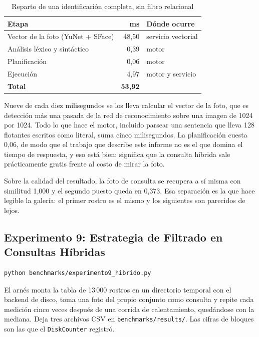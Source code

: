 \documentclass[a4paper,12pt]{article}
\begin{document}
\begin{table}[H]
\centering
\caption{Reparto de una identificación completa, sin filtro relacional}
\begin{tabular}{@{}lrl@{}}
\toprule
\textbf{Etapa} & \textbf{ms} & \textbf{Dónde ocurre} \\
\midrule
Vector de la foto (YuNet + SFace) & 48{,}50 & servicio vectorial \\
Análisis léxico y sintáctico & 0{,}39 & motor \\
Planificación & 0{,}06 & motor \\
Ejecución & 4{,}97 & motor y servicio \\
\midrule
\textbf{Total} & \textbf{53{,}92} & \\
\bottomrule
\end{tabular}
\end{table}

Nueve de cada diez milisegundos se los lleva calcular el vector de la foto, que
es detección más una pasada de la red de reconocimiento sobre una imagen de
1024 por 1024. Todo lo que hace el motor, incluido parsear una sentencia que
lleva 128 flotantes escritos como literal, suma cinco milisegundos. La
planificación cuesta 0{,}06, de modo que el trabajo que describe este informe no
es el que domina el tiempo de respuesta, y eso está bien: significa que la
consulta híbrida sale prácticamente gratis frente al costo de mirar la foto.

Sobre la calidad del resultado, la foto de consulta se recupera a sí misma con
similitud 1{,}000 y el segundo puesto queda en 0{,}373. Esa separación es la que
hace legible la galería: el primer rostro es el mismo y los siguientes son
parecidos de lejos.

\subsection{Experimento 9: Estrategia de Filtrado en Consultas Híbridas}

\begin{lstlisting}[language=bash, caption={Ejecución del experimento}]
python benchmarks/experimento9_hibrido.py
\end{lstlisting}

El arnés monta la tabla de 13\,000 rostros en un directorio temporal con el
backend de disco, toma una foto del propio conjunto como consulta y repite cada
medición cinco veces después de una corrida de calentamiento, quedándose con la
mediana. Deja tres archivos CSV en \texttt{benchmarks/results/}. Las cifras de
bloques son las que el \texttt{DiskCounter} registró.
\end{document}
